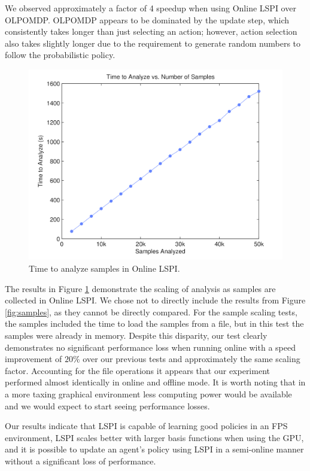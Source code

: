 We observed approximately a factor of 4 speedup when using Online LSPI over OLPOMDP. OLPOMDP appears to be dominated by the update step, which consistently takes longer than just selecting an action; however, action selection also takes slightly longer due to the requirement to generate random numbers to follow the probabilistic policy.

\begin{figure}
	\centering
		\includegraphics[height=0.33\paperheight]{Online_Time_vs_Samples.png}
	\caption{Time to analyze samples in Online LSPI.}
	\label{fig:online:samples}
\end{figure}

The results in Figure \ref{fig:online:samples} demonstrate the scaling of analysis as samples are collected in Online LSPI. We chose not to directly include the results from Figure \ref{fig:samples}, as they cannot be directly compared. For the sample scaling tests, the samples included the time to load the samples from a file, but in this test the samples were already in memory. Despite this disparity, our test clearly demonstrates no significant performance loss when running online with a speed improvement of $20\%$ over our previous tests and approximately the same scaling factor. Accounting for the file operations it appears that our experiment performed almost identically in online and offline mode. It is worth noting that in a more taxing graphical environment less computing power would be available and we would expect to start seeing performance losses.

Our results indicate that LSPI is capable of learning good policies in an FPS environment, LSPI scales better with larger basis functions when using the GPU, and it is possible to update an agent's policy using LSPI in a semi-online manner without a significant loss of performance.

